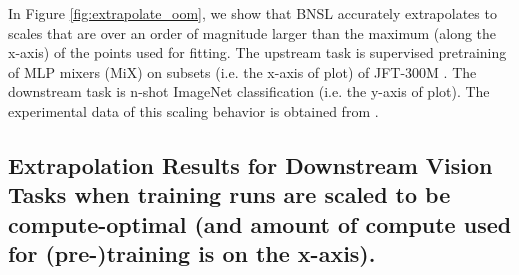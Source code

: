 \documentclass{article} %
\begin{document}
In Figure \ref{fig:extrapolate_oom}, we show that BNSL accurately extrapolates to scales that are over an order of magnitude larger than the maximum (along the x-axis) of the points used for fitting. The upstream task is supervised pretraining of MLP mixers (MiX) \citep{tolstikhin2021mlp} on subsets (i.e. the x-axis of plot) of JFT-300M \citep{sun2017revisiting}. The downstream task is n-shot ImageNet classification (i.e. the y-axis of plot). The experimental data of this scaling behavior is obtained from \cite{Alabdulmohsi2022revisiting}.

\clearpage

\vspace*{-17.9mm}

\subsection{Extrapolation Results for Downstream Vision Tasks when training runs are scaled to be compute-optimal (and amount of compute used for (pre-)training is on the x-axis).}
\label{section:vision_tasks__compute_optimal}

\vspace{-0.4mm}
\end{document}
